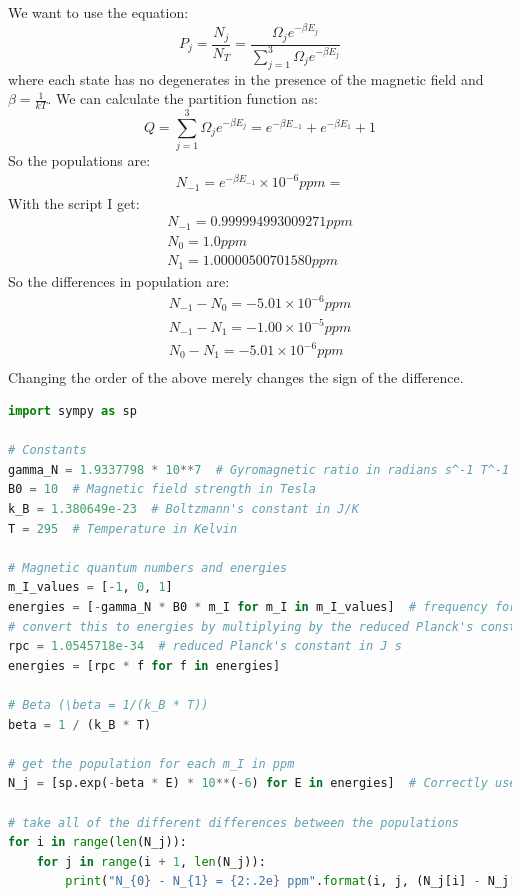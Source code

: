 \documentclass[12pt]{article}
\begin{document}
\subsection{}
We want to use the equation:
\begin{equation}
  P_{j} = \frac{N_{j}}{N_{T}} = \frac{\Omega _{j}e^{-\beta E_{j}}}{\sum_{j=1}^{3} \Omega _{j}e^{-\beta E_{j}}}
\end{equation}
where each state has no degenerates in the presence of the magnetic field and $\beta = \frac{1}{kT}$. We can calculate the partition function as:
\begin{equation}
  Q = \sum_{j=1}^{3} \Omega _{j}e^{-\beta E_{j}} = e^{-\beta E_{-1}} + e^{-\beta E_1} + 1
\end{equation}
So the populations are:
\begin{align}
  N_{-1} = e^{-\beta E_{-1}} \times 10^{-6} ppm = 
\end{align}
With the script I get:
\begin{align}
  N_{-1} = 0.999994993009271 ppm\\
  N_{0} = 1.0 ppm\\
  N_{1} = 1.00000500701580 ppm
\end{align}
So the differences in population are:
\begin{align}
  N_{-1} - N_{0} = -5.01 \times 10^{-6} ppm\\
  N_{-1} - N_{1} = -1.00 \times 10^{-5} ppm\\
  N_{0} - N_{1} = -5.01 \times 10^{-6} ppm \\
\end{align}
Changing the order of the above merely changes the sign of the difference.
\begin{lstlisting}[language=Python]
import sympy as sp

# Constants
gamma_N = 1.9337798 * 10**7  # Gyromagnetic ratio in radians s^-1 T^-1
B0 = 10  # Magnetic field strength in Tesla
k_B = 1.380649e-23  # Boltzmann's constant in J/K
T = 295  # Temperature in Kelvin

# Magnetic quantum numbers and energies
m_I_values = [-1, 0, 1]
energies = [-gamma_N * B0 * m_I for m_I in m_I_values]  # frequency for each m_I
# convert this to energies by multiplying by the reduced Planck's constant
rpc = 1.0545718e-34  # reduced Planck's constant in J s
energies = [rpc * f for f in energies]

# Beta (\beta = 1/(k_B * T))
beta = 1 / (k_B * T)

# get the population for each m_I in ppm
N_j = [sp.exp(-beta * E) * 10**(-6) for E in energies]  # Correctly use list comprehension

# take all of the different differences between the populations
for i in range(len(N_j)):
    for j in range(i + 1, len(N_j)):
        print("N_{0} - N_{1} = {2:.2e} ppm".format(i, j, (N_j[i] - N_j[j]).evalf()))

    

\end{lstlisting}
\end{document}
